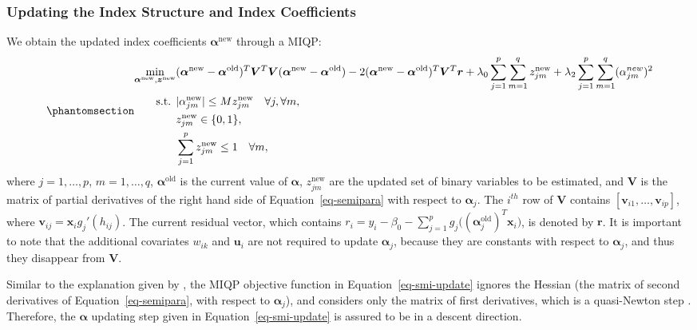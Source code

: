 \documentclass[
  11pt,
  a4paper,
]{article}
\begin{document}
\subsubsection{Updating the Index Structure and Index
Coefficients}\label{sec-step3}

We obtain the updated index coefficients \(\bm{\alpha}^{\text{new}}\)
through a MIQP: \begin{equation}\phantomsection\label{eq-smi-update}{
\begin{aligned}
  \min_{\bm{\alpha}^{\text{new}}, \bm{z}^{\text{new}}} & (\bm{\alpha}^{\text{new}} - \bm{\alpha}^{\text{old}})^{T}\bm{V}^{T}\bm{V}(\bm{\alpha}^{\text{new}} - \bm{\alpha}^{\text{old}}) - 2(\bm{\alpha}^{\text{new}} - \bm{\alpha}^{\text{old}})^{T}\bm{V}^{T}\bm{r} + \lambda_{0}\sum_{j = 1}^{p}\sum_{m = 1}^{q}z_{jm}^{\text{new}} + \lambda_{2}\sum_{j = 1}^{p}\sum_{m = 1}^{q}(\alpha_{jm}^{new})^2 \\
  \text{s.t. } & |\alpha_{jm}^{\text{new}}| \le Mz_{jm}^{\text{new}} \quad \forall j, \forall m,\\
  & z_{jm}^{\text{new}} \in \{0, 1\}, \\
  & \sum_{j = 1}^{p}z_{jm}^{\text{new}} \le 1 \quad \forall m,
\end{aligned}
}\end{equation} where \(j = 1, \dots, p\), \(m = 1, \dots, q\),
\(\bm{\alpha}^{\text{old}}\) is the current value of \(\bm{\alpha}\),
\(z_{jm}^{\text{new}}\) are the updated set of binary variables to be
estimated, and \(\bm{V}\) is the matrix of partial derivatives of the
right hand side of Equation~\ref{eq-semipara} with respect to
\(\bm{\alpha}_{j}\). The \(i^{th}\) row of \(\bm{V}\) contains
\([ \bm{v}_{i1}, \dots, \bm{v}_{ip}]\), where
\(\bm{v}_{ij} = \bm{x}_{i}g_{j}'(h_{ij})\). The current residual vector,
which contains
\(r_{i} = y_{i} - \beta_{0} - \sum_{j = 1}^{p}g_{j}\big((\bm{\alpha}_{j}^{\text{old}})^T\bm{x}_{i}\big)\),
is denoted by \(\bm{r}\). It is important to note that the additional
covariates \(w_{ik}\) and \(\bm{u}_{i}\) are not required to update
\(\bm{\alpha}_{j}\), because they are constants with respect to
\(\bm{\alpha}_{j}\), and thus they disappear from \(\bm{V}\).

Similar to the explanation given by \textcite{Masselot2022}, the MIQP
objective function in Equation~\ref{eq-smi-update} ignores the Hessian
(the matrix of second derivatives of Equation~\ref{eq-semipara}, with
respect to \(\bm{\alpha}_{j}\)), and considers only the matrix of first
derivatives, which is a quasi-Newton step \autocite{Peng2022}.
Therefore, the \(\bm{\alpha}\) updating step given in
Equation~\ref{eq-smi-update} is assured to be in a descent direction.
\end{document}
